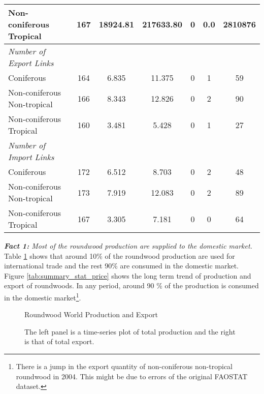 \documentclass[a4paper,12pt]{article}
\begin{document}
\begin{table}[htbp]
\begin{tabular}{lcccccc}
Non-coniferous Tropical & 167 & 18924.81 & 217633.80 & 0 & 0.0 & 2810876\\

\midrule
\emph{Number of Export Links}\\
Coniferous & 164 & 6.835 & 11.375 & 0 & 1 & 59\\

Non-coniferous Non-tropical & 166 & 8.343 & 12.826 & 0 & 2 & 90\\

Non-coniferous Tropical & 160 & 3.481 & 5.428 & 0 & 1 & 27\\
\midrule
\emph{Number of Import Links}\\
Coniferous & 172 & 6.512 & 8.703 & 0 & 2 & 48\\

Non-coniferous Non-tropical & 173 & 7.919 & 12.083 & 0 & 2 & 89\\
Non-coniferous Tropical & 167 & 3.305 & 7.181 & 0 & 0 & 64\\
\midrule \midrule
        \end{tabular}
        \label{tab:summary_stat}
 \end{table}


\textit{\textbf{Fact 1:} Most of the roundwood production are supplied to the domestic market.} \\
Table \ref{tab:summary_stat} shows that around 10\% of the roundwood production are used for international trade and the rest 90\% are consumed in the domestic market. Figure \ref{tab:summary_stat_price} shows the long term trend of production and export of roundwoods. In any period, around 90 \% of the production is consumed in the domestic market\footnote{There is a jump in the export quantity of non-coniferous non-tropical roundwood in 2004. This might be due to errors of the original FAOSTAT dataset.}.\\

\begin{figure}[htbp]
    \centering
    \caption{Roundwood World Production and Export}
    \caption*{\small{The left panel is a time-series plot of total production and the right is that of total export.}}
    \label{fig:time_series_prod_exp}
\end{figure}
\end{document}
